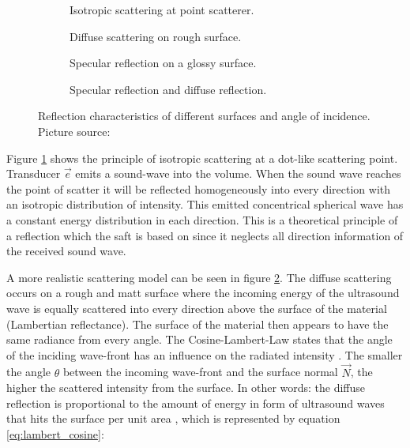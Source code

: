 \begin{figure}[H]
     \centering
     \begin{subfigure}[b]{0.23\textwidth}
         \centering
         \caption{Isotropic scattering at point scatterer.}
         \label{fig:reflect_isotropic}
     \end{subfigure}
     \hfill
     \begin{subfigure}[b]{0.23\textwidth}
         \centering
         \caption{Diffuse scattering on rough surface.}
         \label{fig:reflect_diffuse}
     \end{subfigure}
     \hfill
     \begin{subfigure}[b]{0.23\textwidth}
         \centering
         \caption{Specular reflection on a glossy surface.}
         \label{fig:reflect_specular}
     \end{subfigure}
     \hfill
     \begin{subfigure}[b]{0.23\textwidth}
         \centering
         \caption{Specular reflection and diffuse reflection.}
         \label{fig:reflect_mixed}
     \end{subfigure}
        \caption{Reflection characteristics of different surfaces and angle of incidence. Picture source: \cite{Kretzek2015EvaluationTomography}}
        \label{fig:types_of_reflect}
\end{figure}


Figure \ref{fig:reflect_isotropic} shows the principle of isotropic scattering at a dot-like scattering point. Transducer $\overrightarrow{e}$ emits a sound-wave into the volume. When the sound wave reaches the point of scatter it will be reflected homogeneously into every direction with an isotropic distribution of intensity. This emitted concentrical spherical wave has a constant energy distribution in each direction. This is a theoretical principle of a reflection which the \ac{saft} is based on since it neglects all direction information of the received sound wave.

A more realistic scattering model can be seen in figure \ref{fig:reflect_diffuse}. The diffuse scattering occurs on a rough and matt surface where the incoming energy of the ultrasound wave is equally scattered into every direction above the surface of the material (Lambertian reflectance). The surface of the material then appears to have the same radiance from every angle. The Cosine-Lambert-Law states that the angle of the inciding wave-front has an influence on the radiated intensity \cite{lambert1892lamberts}.
The smaller the angle $\theta$ between the incoming wave-front and the surface normal $\overrightarrow{N}$, the higher the scattered intensity from the surface. In other words: the diffuse reflection is proportional to the amount of energy in form of ultrasound waves that hits the surface per unit area \cite{illum_Phong}, which is represented by equation \ref{eq:lambert_cosine}:

